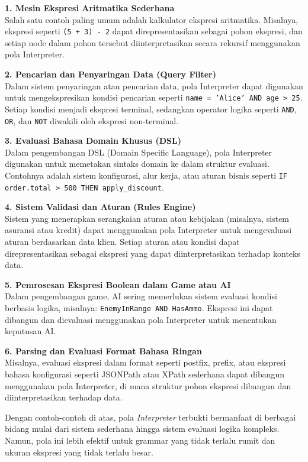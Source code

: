 \textbf{1. Mesin Ekspresi Aritmatika Sederhana} \\
Salah satu contoh paling umum adalah kalkulator ekspresi aritmatika. Misalnya, ekspresi seperti \texttt{(5 + 3) - 2} dapat direpresentasikan sebagai pohon ekspresi, dan setiap node dalam pohon tersebut diinterpretasikan secara rekursif menggunakan pola Interpreter.

\textbf{2. Pencarian dan Penyaringan Data (Query Filter)} \\
Dalam sistem penyaringan atau pencarian data, pola Interpreter dapat digunakan untuk mengekspresikan kondisi pencarian seperti \texttt{name = 'Alice' AND age > 25}. Setiap kondisi menjadi ekspresi terminal, sedangkan operator logika seperti \texttt{AND}, \texttt{OR}, dan \texttt{NOT} diwakili oleh ekspresi non-terminal.

\textbf{3. Evaluasi Bahasa Domain Khusus (DSL)} \\
Dalam pengembangan DSL (Domain Specific Language), pola Interpreter digunakan untuk memetakan sintaks domain ke dalam struktur evaluasi. Contohnya adalah sistem konfigurasi, alur kerja, atau aturan bisnis seperti \texttt{IF order.total > 500 THEN apply\_discount}.

\textbf{4. Sistem Validasi dan Aturan (Rules Engine)} \\
Sistem yang menerapkan serangkaian aturan atau kebijakan (misalnya, sistem asuransi atau kredit) dapat menggunakan pola Interpreter untuk mengevaluasi aturan berdasarkan data klien. Setiap aturan atau kondisi dapat direpresentasikan sebagai ekspresi yang dapat diinterpretasikan terhadap konteks data.

\textbf{5. Pemrosesan Ekspresi Boolean dalam Game atau AI} \\
Dalam pengembangan game, AI sering memerlukan sistem evaluasi kondisi berbasis logika, misalnya: \texttt{EnemyInRange AND HasAmmo}. Ekspresi ini dapat dibangun dan dievaluasi menggunakan pola Interpreter untuk menentukan keputusan AI.

\textbf{6. Parsing dan Evaluasi Format Bahasa Ringan} \\
Misalnya, evaluasi ekspresi dalam format seperti postfix, prefix, atau ekspresi bahasa konfigurasi seperti JSONPath atau XPath sederhana dapat dibangun menggunakan pola Interpreter, di mana struktur pohon ekspresi dibangun dan diinterpretasikan terhadap data.

Dengan contoh-contoh di atas, pola \textit{Interpreter} terbukti bermanfaat di berbagai bidang mulai dari sistem sederhana hingga sistem evaluasi logika kompleks. Namun, pola ini lebih efektif untuk grammar yang tidak terlalu rumit dan ukuran ekspresi yang tidak terlalu besar.


